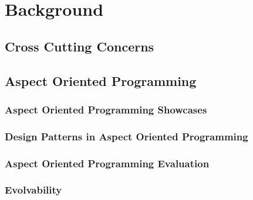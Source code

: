 \chapter{Background}\label{Background}

\section{Cross Cutting Concerns}\label{Cross Cutting Concerns}

\section{Aspect Oriented Programming}\label{Aspect Oriented Programming}

\subsection{Aspect Oriented Programming Showcases}\label{Aspect Oriented Programming Showcases}

\subsection{Design Patterns in Aspect Oriented Programming}\label{Design Patterns in Aspect Oriented Programming}

\subsection{Aspect Oriented Programming Evaluation}\label{Aspect Oriented Programming Evaluation}

\subsection{Evolvability}\label{Aspect Oriented Programming Evolvability}

